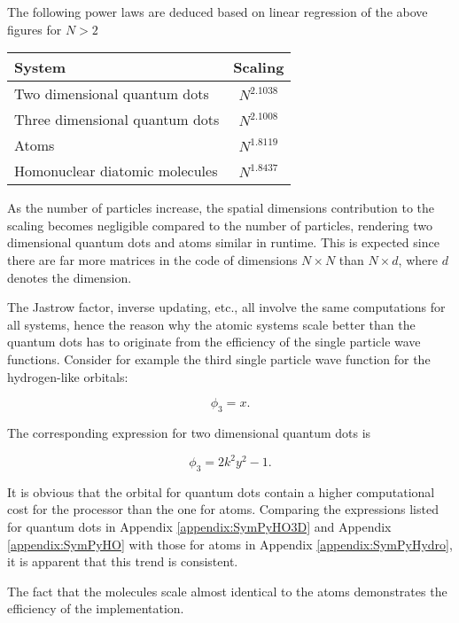 The following power laws are deduced based on linear regression of the above figures for $N > 2$

\begin{tabular}{l|c}
System & Scaling \\
\hline
Two dimensional quantum dots & $N^{2.1038}$ \\
Three dimensional quantum dots & $N^{2.1008}$ \\
Atoms & $N^{1.8119}$ \\
Homonuclear diatomic molecules & $N^{1.8437}$ \\ 
\end{tabular}


As the number of particles increase, the spatial dimensions contribution to the scaling becomes negligible compared to the number of particles, rendering two dimensional quantum dots and atoms similar in runtime. This is expected since there are far more matrices in the code of dimensions $N\times N$ than $N \times d$, where $d$ denotes the dimension. 

The Jastrow factor, inverse updating, etc., all involve the same computations for all systems, hence the reason why the atomic systems scale better than the quantum dots has to originate from the efficiency of the single particle wave functions. Consider for example the third single particle wave function for the hydrogen-like orbitals:

\begin{equation}
 \phi_3 = x.
\end{equation}

The corresponding expression for two dimensional quantum dots is

\begin{equation}
  \phi_3 = 2k^2y^2 - 1.
\end{equation}

It is obvious that the orbital for quantum dots contain a higher computational cost for the processor than the one for atoms. Comparing the expressions listed for quantum dots in Appendix \ref{appendix:SymPyHO3D} and Appendix \ref{appendix:SymPyHO} with those for atoms in Appendix \ref{appendix:SymPyHydro}, it is apparent that this trend is consistent.

The fact that the molecules scale almost identical to the atoms demonstrates the efficiency of the implementation. 





